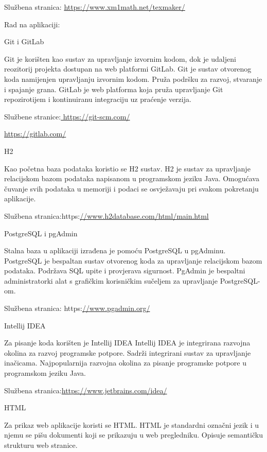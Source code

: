 Službena stranica: \url{https://www.xm1math.net/texmaker/}
\vspace{8mm}

Rad na aplikaciji:
\vspace{4mm}

Git i GitLab

Git je korišten kao sustav za upravljanje izvornim kodom, dok je udaljeni reozitorij projekta dostupan na web platformi GitLab.
Git je sustav otvorenog koda namijenjen upravljanju izvornim kodom. Pruža podršku za razvoj, stvaranje i spajanje grana.
GitLab je web platforma koja pruža upravljanje Git repozirotijem i kontinuiranu integraciju uz praćenje verzija. 

Službene stranice:\url{ https://git-scm.com/}

\url{https://gitlab.com/}
\vspace{3mm}

H2

Kao početna baza podataka koristio se H2 sustav.
H2 je sustav za upravljanje relacijskom bazom podataka napisanom u programskom jeziku Java. Omogućava čuvanje svih podataka u memoriji i podaci se osvježavaju pri svakom pokretanju aplikacije.

Službena stranica:https:\url{//www.h2database.com/html/main.html }
\vspace{3mm}

PostgreSQL i pgAdmin

Stalna baza u aplikaciji izrađena je pomoću PostgreSQL u pgAdminu.
PostgreSQL je bespaltan sustav otvorenog koda za upravljanje relacijskom bazom podataka. Podržava SQL upite i provjerava sigurnost.
PgAdmin je bespaltni administratorki alat s grafičkim korisničkim sučeljem za upravljanje PostgreSQL-om.

Službena stranica: https:\url{//www.pgadmin.org/}
\vspace{3mm}

Intellij IDEA

Za pisanje koda korišten je Intellij IDEA
Intellij IDEA je integrirana razvojna okolina za razvoj programske potpore. Sadrži integrirani sustav za upravljanje inačicama. Najpopularnija razvojna okolina za pisanje programske potpore u programskom jeziku Java.

Službena stranica:\url{https://www.jetbrains.com/idea/}
\vspace{6mm}


HTML

Za prikaz web aplikacije koristi se HTML. 
HTML je standardni označni jezik i u njemu se pišu dokumenti koji se prikazuju u web pregledniku. Opisuje semantičku strukturu web stranice.
\vspace{3mm}

